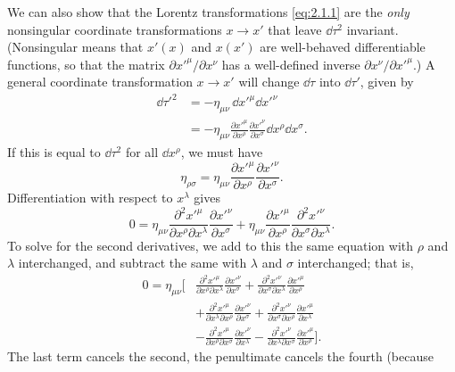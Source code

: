 We can also show that the Lorentz transformations \eqref{eq:2.1.1} are the
\emph{only} nonsingular coordinate transformations \(x\to x'\) that leave
\(\dd\tau^2\) invariant. (Nonsingular means that \(x'(x)\) and \(x(x')\) are
well-behaved differentiable functions, so that the matrix
\(\partial x'^\mu/\partial x^\nu\) has a well-defined inverse
\(\partial x^\nu/\partial x'^\mu\).) A general coordinate transformation
\(x\to x'\) will change \(\dd\tau\) into \(\dd\tau'\), given by
\[
\begin{aligned}
  \dd\tau'^2
  &=-\eta_{\mu\nu}\,\dd x'^\mu \dd x'^\nu \\
  &=-\eta_{\mu\nu}
    \frac{\partial x'^\mu}{\partial x^\rho}
    \frac{\partial x'^\nu}{\partial x^\sigma}
    \dd x^\rho \dd x^\sigma .
\end{aligned}
\]
If this is equal to \(\dd\tau^2\) for all \(\dd x^\rho\), we must have
\begin{equation}
  \eta_{\rho\sigma}
  =\eta_{\mu\nu}
    \frac{\partial x'^\mu}{\partial x^\rho}
    \frac{\partial x'^\nu}{\partial x^\sigma}.
  \tag{2.1.7}\label{eq:2.1.7}
\end{equation}
Differentiation with respect to \(x^\lambda\) gives
\[
  0=\eta_{\mu\nu}
  \frac{\partial^2x'^\mu}{\partial x^\rho\partial x^\lambda}
  \frac{\partial x'^\nu}{\partial x^\sigma}
  +\eta_{\mu\nu}
  \frac{\partial x'^\mu}{\partial x^\rho}
  \frac{\partial^2x'^\nu}{\partial x^\sigma\partial x^\lambda}.
\]
To solve for the second derivatives, we add to this the same equation with
\(\rho\) and \(\lambda\) interchanged, and subtract the same with \(\lambda\)
and \(\sigma\) interchanged; that is,
\[
\begin{aligned}
0=\eta_{\mu\nu}\Bigg[
&\frac{\partial^2x'^\mu}{\partial x^\rho\partial x^\lambda}
 \frac{\partial x'^\nu}{\partial x^\sigma}
+\frac{\partial^2x'^\nu}{\partial x^\sigma\partial x^\lambda}
 \frac{\partial x'^\mu}{\partial x^\rho}\\
&+\frac{\partial^2x'^\mu}{\partial x^\lambda\partial x^\rho}
 \frac{\partial x'^\nu}{\partial x^\sigma}
+\frac{\partial^2x'^\nu}{\partial x^\sigma\partial x^\rho}
 \frac{\partial x'^\mu}{\partial x^\lambda}\\
&-\frac{\partial^2x'^\mu}{\partial x^\rho\partial x^\sigma}
 \frac{\partial x'^\nu}{\partial x^\lambda}
-\frac{\partial^2x'^\nu}{\partial x^\lambda\partial x^\sigma}
 \frac{\partial x'^\mu}{\partial x^\rho}
\Bigg].
\end{aligned}
\]
The last term cancels the second, the penultimate cancels the fourth (because
